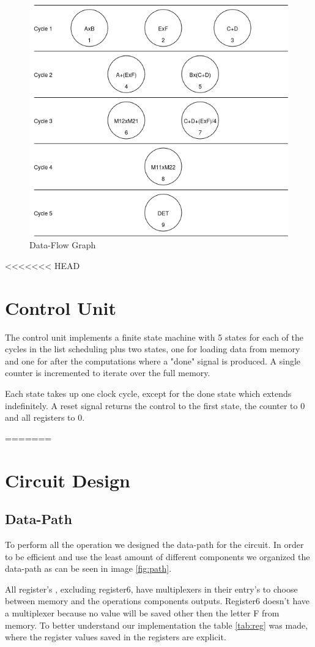 \documentclass[12pt]{article}
\begin{document}
\begin{figure}[H]
	\centering
	\includegraphics[width=0.55\linewidth]{Imagens/stop.drawio.png}
	\caption{Data-Flow Graph}
	\label{fig:sch}
\end{figure}

<<<<<<< HEAD
\section{Control Unit}
The control unit implements a finite state machine with 5 states for each of the cycles in the list scheduling plus two states, one for loading data from memory and one for after the computations where a "done" signal is produced. A single counter is incremented to iterate over the full memory.

Each state takes up one clock cycle, except for the done state which extends indefinitely. A reset signal returns the control to the first state, the counter to 0 and all registers to 0. 

=======
\section{Circuit Design}
\subsection{Data-Path}
To perform all the operation we designed the data-path for the circuit. In order to be efficient and use the least amount of different components we organized the data-path as can be seen in image \ref{fig:path}. 

All register's , excluding register6, have multiplexers in their entry's to choose between memory and the operations components outputs. Register6 doesn't have a multiplexer because no value will be saved other then the letter F from memory. To better understand our implementation the table \ref{tab:reg} was made, where the register values saved in the registers are explicit.
\end{document}
